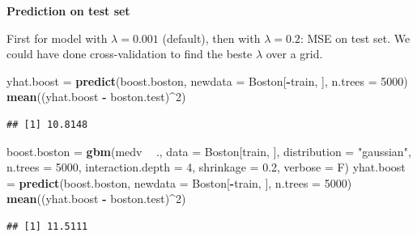 \documentclass[ignorenonframetext,]{beamer}
\newenvironment{Shaded}{\begin{snugshade}}{\end{snugshade}}
\newcommand{\KeywordTok}[1]{\textcolor[rgb]{0.13,0.29,0.53}{\textbf{#1}}}
\newcommand{\DataTypeTok}[1]{\textcolor[rgb]{0.13,0.29,0.53}{#1}}
\newcommand{\DecValTok}[1]{\textcolor[rgb]{0.00,0.00,0.81}{#1}}
\newcommand{\FloatTok}[1]{\textcolor[rgb]{0.00,0.00,0.81}{#1}}
\newcommand{\StringTok}[1]{\textcolor[rgb]{0.31,0.60,0.02}{#1}}
\newcommand{\OperatorTok}[1]{\textcolor[rgb]{0.81,0.36,0.00}{\textbf{#1}}}
\newcommand{\NormalTok}[1]{#1}
\begin{document}
\begin{frame}[fragile]

\textbf{Prediction on test set}

First for model with \(\lambda=0.001\) (default), then with
\(\lambda=0.2\): MSE on test set. We could have done cross-validation to
find the beste \(\lambda\) over a grid.

\begin{Shaded}
\begin{Highlighting}[]
\NormalTok{yhat.boost =}\StringTok{ }\KeywordTok{predict}\NormalTok{(boost.boston, }\DataTypeTok{newdata =}\NormalTok{ Boston[}\OperatorTok{-}\NormalTok{train, ], }\DataTypeTok{n.trees =} \DecValTok{5000}\NormalTok{)}
\KeywordTok{mean}\NormalTok{((yhat.boost }\OperatorTok{-}\StringTok{ }\NormalTok{boston.test)}\OperatorTok{^}\DecValTok{2}\NormalTok{)}
\end{Highlighting}
\end{Shaded}

\begin{verbatim}
## [1] 10.8148
\end{verbatim}

\begin{Shaded}
\begin{Highlighting}[]
\NormalTok{boost.boston =}\StringTok{ }\KeywordTok{gbm}\NormalTok{(medv }\OperatorTok{~}\StringTok{ }\NormalTok{., }\DataTypeTok{data =}\NormalTok{ Boston[train, ], }\DataTypeTok{distribution =} \StringTok{"gaussian"}\NormalTok{, }
    \DataTypeTok{n.trees =} \DecValTok{5000}\NormalTok{, }\DataTypeTok{interaction.depth =} \DecValTok{4}\NormalTok{, }\DataTypeTok{shrinkage =} \FloatTok{0.2}\NormalTok{, }\DataTypeTok{verbose =}\NormalTok{ F)}
\NormalTok{yhat.boost =}\StringTok{ }\KeywordTok{predict}\NormalTok{(boost.boston, }\DataTypeTok{newdata =}\NormalTok{ Boston[}\OperatorTok{-}\NormalTok{train, ], }\DataTypeTok{n.trees =} \DecValTok{5000}\NormalTok{)}
\KeywordTok{mean}\NormalTok{((yhat.boost }\OperatorTok{-}\StringTok{ }\NormalTok{boston.test)}\OperatorTok{^}\DecValTok{2}\NormalTok{)}
\end{Highlighting}
\end{Shaded}

\begin{verbatim}
## [1] 11.5111
\end{verbatim}

\end{frame}
\end{document}
